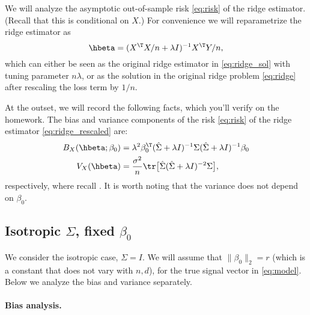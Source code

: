 \documentclass{article}
\begin{document}
We will analyze the asymptotic out-of-sample risk \eqref{eq:risk} of the ridge
estimator. (Recall that this is conditional on $X$.) For convenience we will
reparametrize the ridge estimator as    
\begin{equation}
\label{eq:ridge_rescaled}
\hbeta = (X^\T X/n + \lambda I)^{-1} X^\T Y/n,
\end{equation}
which can either be seen as the original ridge estimator in \eqref{eq:ridge_sol} 
with tuning parameter $n\lambda$, or as the solution in the original ridge
problem \eqref{eq:ridge} after rescaling the loss term by $1/n$.  

At the outset, we will record the following facts, which you'll verify on the
homework. The bias and variance components of the risk \eqref{eq:risk} of the
ridge estimator \eqref{eq:ridge_rescaled} are:     
\begin{align}
\label{eq:ridge_bias}
B_X(\hbeta; \beta_0) &= \lambda^2 \beta_0^\T (\hSigma + \lambda I)^{-1}
  \Sigma (\hSigma + \lambda I)^{-1} \beta_0 \\ 
\label{eq:ridge_var}
V_X(\hbeta) &= \frac{\sigma^2}{n} \tr \big[ \hSigma ( \hSigma + \lambda
  I)^{-2} \Sigma \big],
\end{align}
respectively, where recall . It is worth noting that
the variance does not depend on $\beta_0$. 

\subsection{Isotropic $\Sigma$, fixed $\beta_0$}

We consider the isotropic case, $\Sigma = I$. We will assume that $\|\beta_0\|_2
= r$ (which is a constant that does not vary with $n,d$), for the true signal
vector in \eqref{eq:model}. Below we analyze the bias and variance separately. 

\paragraph{Bias analysis.}
\end{document}
